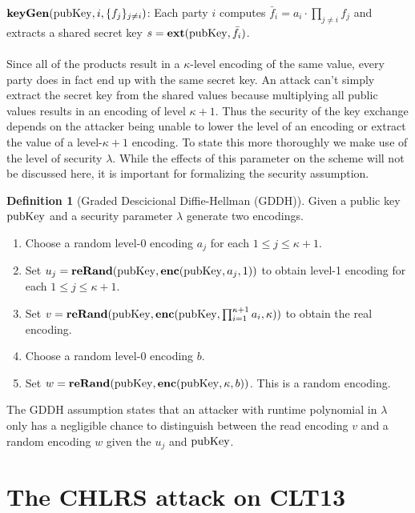 \documentclass[english]{scrartcl}
\theoremstyle{plain}
\theoremstyle{definition}
\newtheorem{definition}[lemma]{Definition}
\begin{document}
    $\mathbf{keyGen}(\mathrm{pubKey}, i, \{ f_j \}_{j \neq i})$: Each party $i$ computes $\bar{f}_i = a_i \cdot \prod_{j \neq i} f_j$ and extracts a shared secret key $s = \mathbf{ext}(\mathrm{pubKey}, \bar{f}_i)$.
    \\\\
    Since all of the products result in a $\kappa$-level encoding of the same value, every party does in fact end up with the same secret key. An attack can't simply extract the secret key from the shared values because multiplying all public values results in an encoding of level $\kappa + 1$.
    Thus the security of the key exchange depends on the attacker being unable to lower the level of an encoding or extract the value of a level-$\kappa + 1$ encoding. To state this more thoroughly we make use of the level of security $\lambda$. While the effects of this parameter on the scheme will not be discussed here, it is important for formalizing the security assumption.

    \begin{definition}[Graded Descicional Diffie-Hellman (GDDH)]
        Given a public key $\mathrm{pubKey}$ and a security parameter $\lambda$ generate two encodings.

        \begin{enumerate}
            \item Choose a random level-0 encoding $a_j$ for each $1 \leq j \leq \kappa + 1$.
            \item Set $u_j = \mathbf{reRand}(\mathrm{pubKey}, \mathbf{enc}(\mathrm{pubKey}, a_j, 1))$ to obtain level-1 encoding for each $1 \leq j \leq \kappa + 1$.
            \item Set $v = \mathbf{reRand}(\mathrm{pubKey}, \mathbf{enc}(\mathrm{pubKey}, \prod_{i=1}^{\kappa + 1} a_i, \kappa))$ to obtain the real encoding.
            \item Choose a random level-0 encoding $b$.
            \item Set $w = \mathbf{reRand}(\mathrm{pubKey}, \mathbf{enc}(\mathrm{pubKey}, \kappa, b))$. This is a random encoding.
        \end{enumerate}

        The GDDH assumption states that an attacker with runtime polynomial in $\lambda$ only has a negligible chance to distinguish between the read encoding $v$ and a random encoding $w$ given the $u_j$ and $\mathrm{pubKey}$.\cite{cryptoeprint:2013:183}
    \end{definition}

    \section{The CHLRS attack on CLT13}
\end{document}
